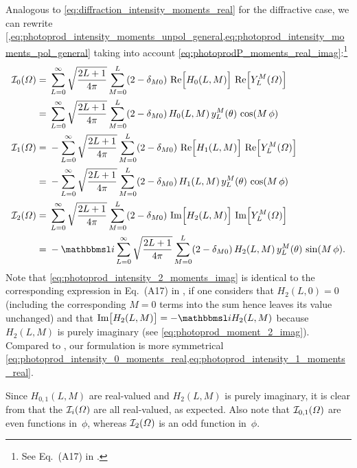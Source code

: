 Analogous to \cref{eq:diffraction_intensity_moments_real} for the
diffractive case, we can rewrite
\cref{,eq:photoprod_intensity_moments_unpol_general,eq:photoprod_intensity_moments_pol_general}
taking into account
\cref{eq:photoprodP_moments_real_imag}:\footnote{See Eq.~(A17) in
.}
\begin{align}
  \intensity_0(\Omega)
  ={}& \sum_{L = 0}^\infty \sqrt{\frac{2 L + 1}{4 \pi}} \sum_{M = 0}^{L} (2 - \delta_{M 0})\, \Re[2]{H_0(L, M)}\, \Re[2]{Y_L^M(\Omega)} \nonumber
  \\
  \label{eq:photoprod_intensity_0_moments_real}
  ={}& \sum_{L = 0}^\infty \sqrt{\frac{2 L + 1}{4 \pi}} \sum_{M = 0}^{L} (2 - \delta_{M 0})\, H_0(L, M)\, y_L^M(\theta)\, \cos(M\, \phi)
  \\
  \intensity_1(\Omega)
  ={}& -\sum_{L = 0}^\infty \sqrt{\frac{2 L + 1}{4 \pi}} \sum_{M = 0}^{L} (2 - \delta_{M 0})\, \Re[2]{H_1(L, M)}\, \Re[2]{Y_L^M(\Omega)} \nonumber
  \\
  \label{eq:photoprod_intensity_1_moments_real}
  ={}& -\sum_{L = 0}^\infty \sqrt{\frac{2 L + 1}{4 \pi}} \sum_{M = 0}^{L} (2 - \delta_{M 0})\, H_1(L, M)\, y_L^M(\theta)\, \cos(M\, \phi)
  \\
  \intensity_2(\Omega)
  ={}& \sum_{L = 0}^\infty \sqrt{\frac{2 L + 1}{4 \pi}} \sum_{M = 0}^{L} (2 - \delta_{M 0})\, \Im[2]{H_2(L, M)}\, \Im[2]{Y_L^M(\Omega)} \nonumber
  \\
  \label{eq:photoprod_intensity_2_moments_imag}
  ={}& -\imag \sum_{L = 0}^\infty \sqrt{\frac{2 L + 1}{4 \pi}} \sum_{M = 0}^{L} (2 - \delta_{M 0})\, H_2(L, M)\, y_L^M(\theta)\, \sin(M\, \phi).
\end{align}
Note that \cref{eq:photoprod_intensity_2_moments_imag} is identical to
the corresponding expression in Eq.~(A17) in
, if one considers that $H_2(L, 0) = 0$
(including the corresponding $M = 0$ terms into the sum hence leaves
its value unchanged) and that $\Im{H_2(L, M)} = -\imag H_2(L, M)$
because $H_2(L, M)$ is purely imaginary (see
\cref{eq:photoprod_moment_2_imag}).  Compared to
, our formulation is more symmetrical \wrt
\cref{eq:photoprod_intensity_0_moments_real,eq:photoprod_intensity_1_moments_real}.

Since $H_{0, 1}(L, M)$ are real-valued and $H_2(L, M)$ is purely
imaginary, it is clear from
that the $\mathcal{I}_i(\Omega)$ are all real-valued, as expected.
Also note that $\mathcal{I}_{0, 1}(\Omega)$ are even functions
in~$\phi$, whereas $\mathcal{I}_2(\Omega)$ is an odd function
in~$\phi$.


